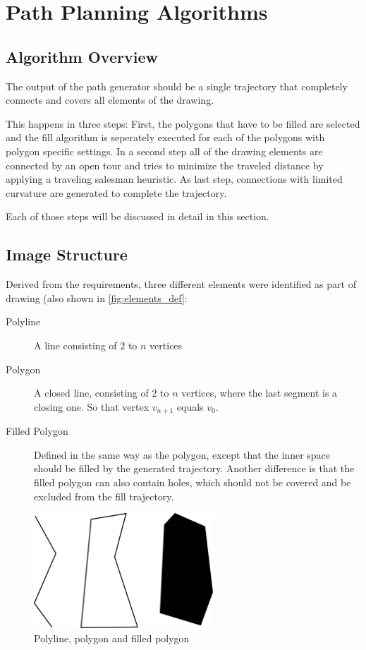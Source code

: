 \chapter{Path Planning Algorithms}
\section{Algorithm Overview}

The output of the path generator should be a single trajectory that completely connects and covers all elements of the drawing.

This happens in three steps: First, the polygons that have to be filled are selected and the fill algorithm is seperately executed for each of the polygons with polygon specific settings. In a second step all of the drawing elements are connected by an open tour and tries to minimize the traveled distance by applying a traveling salesman heuristic. As last step, connections with limited curvature are generated to complete the trajectory.

Each of those steps will be discussed in detail in this section.
\section{Image Structure}

Derived from the requirements, three different elements were identified as part of drawing (also shown in \autoref{fig:elements_def}:

\begin{description}
\item[Polyline] A line consisting of $2$ to $n$ vertices
\item[Polygon] A closed line, consisting of $2$ to $n$ vertices, where the last segment is a closing one. So that vertex $v_{n+1}$ equals $v_0$.
\item[Filled Polygon] Defined in the same way as the polygon, except that the inner space should be filled by the generated trajectory. Another difference is that the filled polygon can also contain holes, which should not be covered and be excluded from the fill trajectory.
\end{description}

\begin{figure}
\centering
\includegraphics[width=0.6\textwidth]{images/path_planning/line_polygon_definition.pdf}
\caption{Polyline, polygon and filled polygon}
\label{fig:elements_def}
\end{figure}

